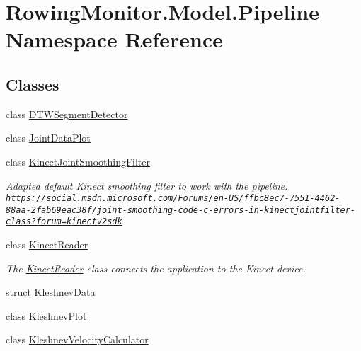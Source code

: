 \hypertarget{namespace_rowing_monitor_1_1_model_1_1_pipeline}{}\section{Rowing\+Monitor.\+Model.\+Pipeline Namespace Reference}
\label{namespace_rowing_monitor_1_1_model_1_1_pipeline}
\subsection*{Classes}
\begin{DoxyCompactItemize}
\item 
class \hyperlink{class_rowing_monitor_1_1_model_1_1_pipeline_1_1_d_t_w_segment_detector}{D\+T\+W\+Segment\+Detector}
\item 
class \hyperlink{class_rowing_monitor_1_1_model_1_1_pipeline_1_1_joint_data_plot}{Joint\+Data\+Plot}
\item 
class \hyperlink{class_rowing_monitor_1_1_model_1_1_pipeline_1_1_kinect_joint_smoothing_filter}{Kinect\+Joint\+Smoothing\+Filter}
\begin{DoxyCompactList}\small\item\em Adapted default Kinect smoothing filter to work with the pipeline. \href{https://social.msdn.microsoft.com/Forums/en-US/ffbc8ec7-7551-4462-88aa-2fab69eac38f/joint-smoothing-code-c-errors-in-kinectjointfilter-class?forum=kinectv2sdk}{\tt https\+://social.\+msdn.\+microsoft.\+com/\+Forums/en-\/\+U\+S/ffbc8ec7-\/7551-\/4462-\/88aa-\/2fab69eac38f/joint-\/smoothing-\/code-\/c-\/errors-\/in-\/kinectjointfilter-\/class?forum=kinectv2sdk} \end{DoxyCompactList}\item 
class \hyperlink{class_rowing_monitor_1_1_model_1_1_pipeline_1_1_kinect_reader}{Kinect\+Reader}
\begin{DoxyCompactList}\small\item\em The \hyperlink{class_rowing_monitor_1_1_model_1_1_pipeline_1_1_kinect_reader}{Kinect\+Reader} class connects the application to the Kinect device. \end{DoxyCompactList}\item 
struct \hyperlink{struct_rowing_monitor_1_1_model_1_1_pipeline_1_1_kleshnev_data}{Kleshnev\+Data}
\item 
class \hyperlink{class_rowing_monitor_1_1_model_1_1_pipeline_1_1_kleshnev_plot}{Kleshnev\+Plot}
\item 
class \hyperlink{class_rowing_monitor_1_1_model_1_1_pipeline_1_1_kleshnev_velocity_calculator}{Kleshnev\+Velocity\+Calculator}

\end{DoxyCompactItemize}
